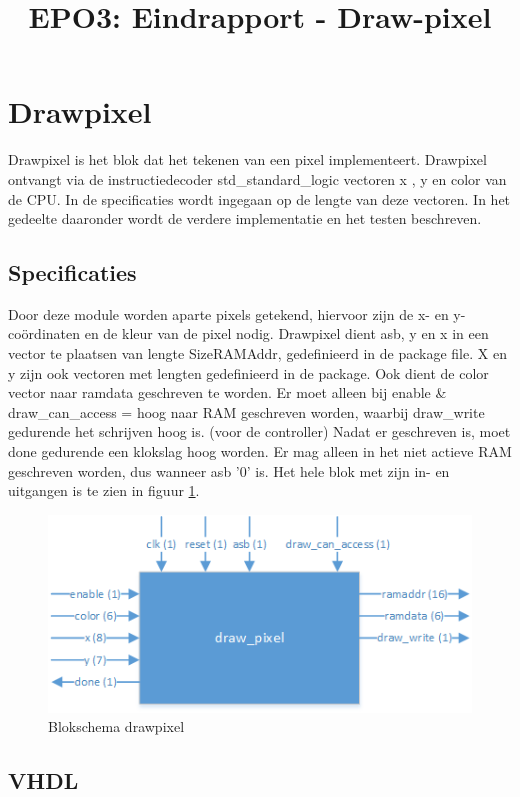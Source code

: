 \documentclass{scrartcl} %
\author{}%
\title{EPO3: Eindrapport - Draw-pixel}
\begin{document}
\section{Drawpixel} %
\label{sec:drawpixel} %

Drawpixel is het blok dat het tekenen van een pixel implementeert. Drawpixel ontvangt via de instructiedecoder std\_standard\_logic vectoren x , y en color van de CPU. In de specificaties wordt ingegaan  op de lengte van deze vectoren. In het gedeelte daaronder wordt de verdere implementatie en het testen beschreven.

\subsection{Specificaties}
\label{ssec:specs_dp}
Door deze module worden aparte pixels getekend, hiervoor zijn de x- en y-coördinaten en de kleur van de pixel nodig. Drawpixel dient asb, y en x in een vector te plaatsen van lengte SizeRAMAddr, gedefinieerd in de package file. X en y zijn ook vectoren met lengten gedefinieerd in de package. Ook dient de color vector naar ramdata geschreven te worden.  Er moet alleen bij enable \& draw\_can\_access = hoog naar RAM geschreven worden, waarbij draw\_write gedurende het schrijven hoog is. (voor de controller)  Nadat er geschreven is, moet done gedurende een klokslag hoog worden. Er mag alleen in het niet actieve RAM geschreven worden, dus wanneer asb '0' is. Het hele blok met zijn in- en uitgangen is te zien in figuur  \ref{fig:dp_blokschema}. 
\begin{figure} [h!]
\centering
\includegraphics [width = \textwidth] {resource/dp_blokschema-rc}
\caption{Blokschema drawpixel}
\label{fig:dp_blokschema}
\end{figure}

\subsection{VHDL}
\label{ssec:vhdl_dp}
\end{document}
